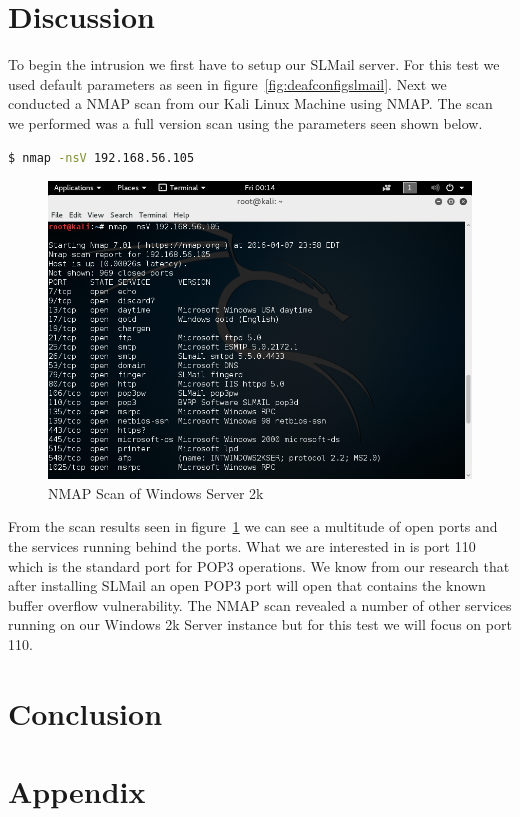 \documentclass[12pt]{article}
\begin{document}
\section{Discussion}
\label{sect:discussion}
To begin the intrusion we first have to setup our SLMail server. For this
test we used default parameters as seen in figure~\ref{fig:deafconfigslmail}.
Next we conducted a NMAP scan from our Kali Linux Machine using NMAP. The
scan we performed was a full version scan using the parameters seen shown 
below.

\begin{lstlisting}[language=bash]
    $ nmap -nsV 192.168.56.105
\end{lstlisting}

\begin{figure}[ht]
    \centering
    \includegraphics[width=5.5in]{images/20160407_nmap_scan.png}
    \caption{NMAP Scan of Windows Server 2k}
    \label{fig:nmapwindows}
\end{figure}

From the scan results seen in figure~\ref{fig:nmapwindows} we can see a
multitude of open ports and the services running behind the ports. What we are
interested in is port 110 which is the standard port for POP3 operations. We
know from our research that after installing SLMail an open POP3 port will
open that contains the known buffer overflow vulnerability. The NMAP scan 
revealed a number of other services running on our Windows 2k Server instance 
but for this test we will focus on port 110. 


\section{Conclusion}
\label{sect:conclusion}


\nocite{*}



\section*{Appendix}
\label{sect:appendix}

\end{document}

